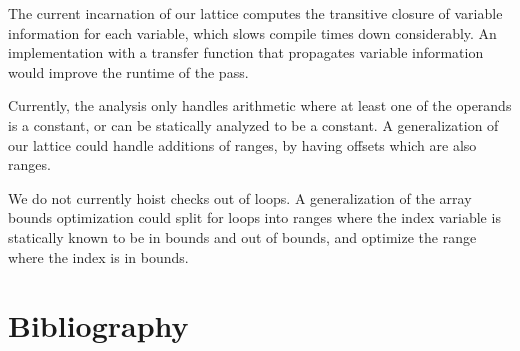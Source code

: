 \documentclass[11pt]{article}
\begin{document}
The current incarnation of our lattice computes the transitive closure of
variable information for each variable, which slows compile times down considerably.
An implementation with a transfer function that propagates variable information would
improve the runtime of the pass.

Currently, the analysis only handles arithmetic where at least one of the operands is
a constant, or can be statically analyzed to be a constant. A generalization of our
lattice could handle additions of ranges, by having offsets which are also ranges.

We do not currently hoist checks out of loops. A generalization of the array bounds optimization
could split for loops into ranges where the index variable is statically known to be in bounds and
out of bounds, and optimize the range where the index is in bounds.

\section{Bibliography}

\printbibliography
\end{document}
